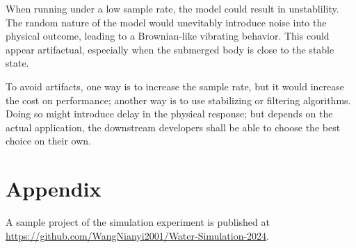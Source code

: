 When running under a low sample rate, the model could result in unstablility.
The random nature of the model would unevitably introduce noise into the physical outcome, leading to a Brownian-like vibrating behavior.
This could appear artifactual, especially when the submerged body is close to the stable state.

To avoid artifacts, one way is to increase the sample rate, but it would increase the cost on performance;
another way is to use stabilizing or filtering algorithms.
Doing so might introduce delay in the physical response;
but depends on the actual application, the downstream developers shall be able to choose the best choice on their own.

\begin{comment}
\section*{Postscripts and Acknowledgements}

This is the first time I have ever written a serious academical article.
It is guaranteed that there will be naive mistakes all over the place.
Please excuse me, thou reader.
If thou hast spotted any mistake, please feel free to contact me at \url{wangnianyi2001@outlook.com}.
My apologies in advance!

Thanks to the team of my graduation project, \emph{Nani Core} (\url{https://github.com/nani-core}).
The idea of this article rose when I was making the water system in the project.
They established the possibilty for this article to happen.
Special thanks to 陈恩晖 (Omnisch) and 张嘉玥 (Limko).
They are two really, really reliable co-workers and good friends of mine.
They have given me the greatest mental and physical support on the project, and an unforgetful memory in my graduation year.
\end{comment}

\section*{Appendix}

A sample project of the simulation experiment is published at \url{https://github.com/WangNianyi2001/Water-Simulation-2024}.